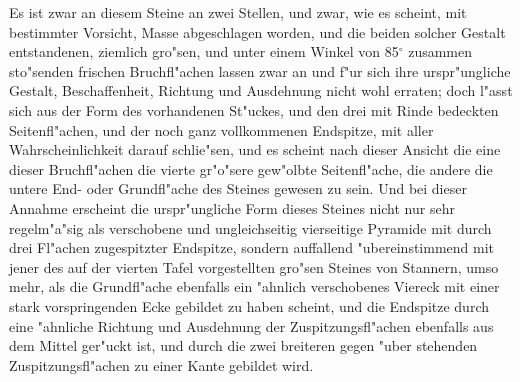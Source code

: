 \documentclass[a4paper, 11pt, oneside, german]{article}
\begin{document}
Es ist zwar an diesem Steine an zwei Stellen, und zwar, wie es scheint, mit bestimmter Vorsicht, Masse abgeschlagen worden, und die beiden solcher Gestalt entstandenen, ziemlich gro"sen, und unter einem Winkel von 85$^{\circ}$ zusammen sto"senden frischen Bruchfl"achen lassen zwar an und f"ur sich ihre urspr"ungliche Gestalt, Beschaffenheit, Richtung und Ausdehnung nicht wohl erraten; doch l"asst sich aus der Form des vorhandenen St"uckes, und den drei mit Rinde bedeckten Seitenfl"achen, und der noch ganz vollkommenen Endspitze, mit aller Wahrscheinlichkeit darauf schlie"sen, und es scheint nach dieser Ansicht die eine dieser Bruchfl"achen die vierte gr"o"sere gew"olbte Seitenfl"ache, die andere die untere End- oder Grundfl"ache des Steines gewesen zu sein. Und bei dieser Annahme erscheint die urspr"ungliche Form dieses Steines nicht nur sehr regelm"a"sig als verschobene und ungleichseitig vierseitige Pyramide mit durch drei Fl"achen zugespitzter Endspitze, sondern auffallend "ubereinstimmend mit jener des auf der vierten Tafel vorgestellten gro"sen Steines von Stannern, umso mehr, als die Grundfl"ache ebenfalls ein "ahnlich verschobenes Viereck mit einer stark vorspringenden Ecke gebildet zu haben scheint, und die Endspitze durch eine "ahnliche Richtung und Ausdehnung der Zuspitzungsfl"achen ebenfalls aus dem Mittel ger"uckt ist, und durch die zwei breiteren gegen "uber stehenden Zuspitzungsfl"achen zu einer Kante gebildet wird.
\end{document}
